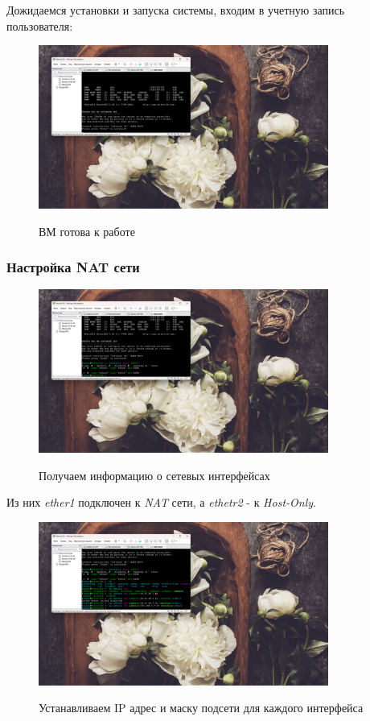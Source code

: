 \documentclass[a4paper]{article}
\begin{document}
  Дожидаемся установки и запуска системы, входим в учетную запись пользователя:
  
  \begin{figure}[H]
    \centering
    \includegraphics[width=0.85\textwidth]{06_00 (88)}
    \label{img:88}
    \caption{ВМ готова к работе}
  \end{figure}
  
  \subsubsection{Настройка NAT сети}

  \begin{figure}[H]
    \centering
    \includegraphics[width=0.85\textwidth]{06_00 (89)}
    \label{img:89}
    \caption{Получаем информацию о сетевых интерфейсах}
  \end{figure}

  Из них \textit{ether1} подключен к \textit{NAT} сети, а \textit{ethetr2} - к \textit{Host-Only}.
  
  \begin{figure}[H]
    \centering
    \includegraphics[width=0.85\textwidth]{06_00 (90)}
    \label{img:90}
    \caption{Устанавливаем IP адрес и маску подсети для каждого интерфейса}
  \end{figure}
\end{document}
